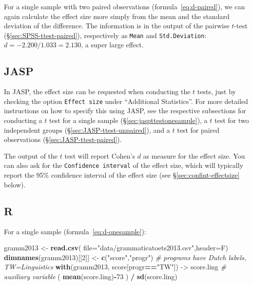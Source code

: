 \documentclass[
]{book}
\newenvironment{Shaded}{\begin{snugshade}}{\end{snugshade}}
\newcommand{\AttributeTok}[1]{\textcolor[rgb]{0.13,0.29,0.53}{#1}}
\newcommand{\CommentTok}[1]{\textcolor[rgb]{0.56,0.35,0.01}{\textit{#1}}}
\newcommand{\DecValTok}[1]{\textcolor[rgb]{0.00,0.00,0.81}{#1}}
\newcommand{\FunctionTok}[1]{\textcolor[rgb]{0.13,0.29,0.53}{\textbf{#1}}}
\newcommand{\NormalTok}[1]{#1}
\newcommand{\OtherTok}[1]{\textcolor[rgb]{0.56,0.35,0.01}{#1}}
\newcommand{\SpecialCharTok}[1]{\textcolor[rgb]{0.81,0.36,0.00}{\textbf{#1}}}
\newcommand{\StringTok}[1]{\textcolor[rgb]{0.31,0.60,0.02}{#1}}
\begin{document}
For a single sample with two paired observations
(formula~\eqref{eq:d-paired}), we can again calculate the effect
size more simply from the mean and the standard deviation of the difference.
The information is in the output of the pairwise \(t\)-test\\
(§\ref{sec:SPSS-ttest-paired}), respectively as \texttt{Mean} and
\texttt{Std.Deviation}:\\
\(d = -2.200 / 1.033 = 2.130\), a super large effect.

\hypertarget{jasp-12}{%
\subsection{JASP}\label{jasp-12}}

In JASP, the effect size can be requested when conducting the \(t\) tests, just by checking the option \texttt{Effect\ size} under ``Additional Statistics''. For more detailed instructions on how to specify this using JASP, see the respective subsections for conducting a \(t\) test for a single sample (§\ref{sec:jaspttestonesample}), a \(t\) test for two independent groups (§\ref{sec:JASP-ttest-unpaired}), and a \(t\) test for paired observations (§\ref{sec:JASP-ttest-paired}).

The output of the \(t\) test will report Cohen's \(d\) as measure for the effect size. You can also ask for the \texttt{Confidence\ interval} of the effect size, which will typically report the 95\% confidence interval of the effect size (see §\ref{sec:confint-effectsize} below).

\hypertarget{r-14}{%
\subsection{R}\label{r-14}}

For a single sample
(formula~\eqref{eq:d-onesample}):\\

\begin{Shaded}
\begin{Highlighting}[]
\NormalTok{gramm2013 }\OtherTok{\textless{}{-}} \FunctionTok{read.csv}\NormalTok{( }\AttributeTok{file=}\StringTok{"data/grammaticatoets2013.csv"}\NormalTok{,}\AttributeTok{header=}\NormalTok{F)}
\FunctionTok{dimnames}\NormalTok{(gramm2013)[[}\DecValTok{2}\NormalTok{]] }\OtherTok{\textless{}{-}} \FunctionTok{c}\NormalTok{(}\StringTok{"score"}\NormalTok{,}\StringTok{"progr"}\NormalTok{)}
\CommentTok{\# programs have Dutch labels, TW=Linguistics}
\FunctionTok{with}\NormalTok{(gramm2013, score[progr}\SpecialCharTok{==}\StringTok{"TW"}\NormalTok{]) }\OtherTok{{-}\textgreater{}}\NormalTok{ score.ling}
\CommentTok{\# auxiliary variable}
\NormalTok{( }\FunctionTok{mean}\NormalTok{(score.ling)}\SpecialCharTok{{-}}\DecValTok{73}\NormalTok{ ) }\SpecialCharTok{/} \FunctionTok{sd}\NormalTok{(score.ling) }
\end{Highlighting}
\end{Shaded}
\end{document}
